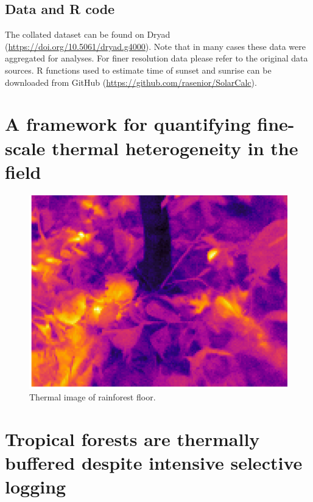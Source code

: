 \documentclass[12pt,a4paper,]{report}
\theoremstyle{definition}
\theoremstyle{definition}
\theoremstyle{definition}
\theoremstyle{remark}
\begin{document}
\section{Data and R code}\label{data-and-r-code}

The collated dataset can be found on Dryad
(\url{https://doi.org/10.5061/dryad.g4000}). Note that in many cases
these data were aggregated for analyses. For finer resolution data
please refer to the original data sources. R functions used to estimate
time of sunset and sunrise can be downloaded from GitHub
(\url{https://github.com/rasenior/SolarCalc}).

\chapter{A framework for quantifying fine-scale thermal heterogeneity in
the
field}\label{a-framework-for-quantifying-fine-scale-thermal-heterogeneity-in-the-field}

\begin{figure}[!htb]
\centering
\includegraphics[width=15cm]{pics/Themal-image1.png}
\caption*{Thermal image of rainforest floor.}
\end{figure}

\pagebreak

\chapter{Tropical forests are thermally buffered despite intensive
selective
logging}\label{tropical-forests-are-thermally-buffered-despite-intensive-selective-logging}
\end{document}
